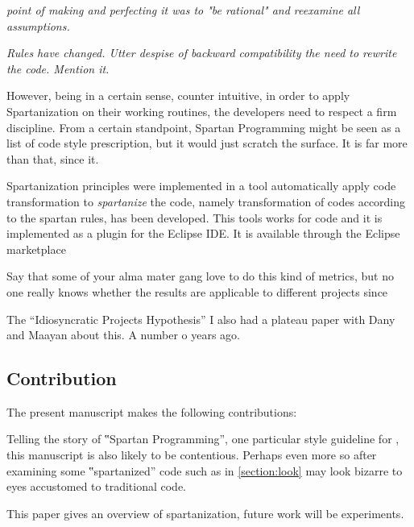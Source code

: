 \emph{point of making and perfecting it was to "be rational" and
reexamine all assumptions.}

\emph{Rules have changed.
Utter despise of backward compatibility the need to rewrite the code.
Mention it.}


However, being in a certain sense, counter intuitive, in order to apply
Spartanization on their working routines, the developers need to respect a
firm discipline. From a certain standpoint, Spartan Programming might be
seen as a list of code style prescription, but it would just scratch the
surface. It is far more than that, since it.

Spartanization principles were implemented in a tool automatically apply code
transformation to \emph{spartanize} the code, namely transformation of codes
according to the spartan rules, has been developed.
This tools works for \Java code and it is implemented as a plugin for the Eclipse
IDE\@. It is available through the Eclipse marketplace

Say that some of your alma mater gang love to do this kind of metrics, but
no one really knows whether the results are applicable to different projects
since~\cite{Turnu:Concas:Marchesi:Tonelli:11}

The ``Idiosyncratic Projects Hypothesis'' I also had a plateau paper with
Dany and Maayan about this. A number o years ago.\cite{Gil:2011:Goldstein:Moshkovich:2011}

\subsection{Contribution}

The present manuscript makes the following contributions:


Telling the story of ‟Spartan Programming”, one particular style guideline for
\Java, this manuscript is also likely to be contentious. Perhaps even more so
after examining some ‟spartanized” code such as in \cref{section:look}
may look bizarre to eyes accustomed to traditional \Java code.



This paper gives an overview of spartanization, future work will be
experiments.
